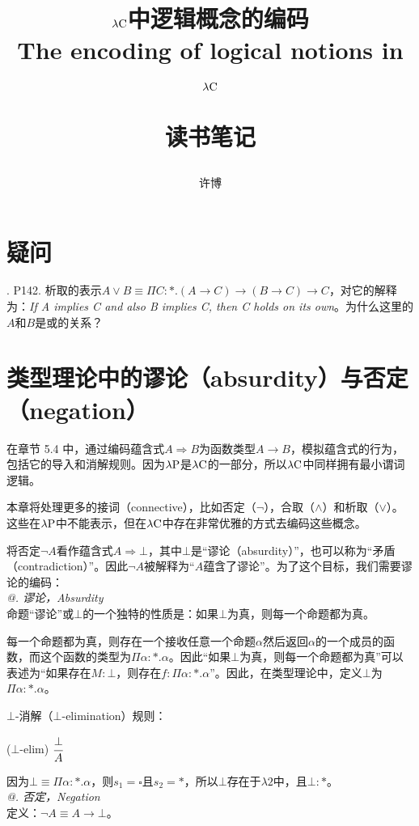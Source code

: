 \documentclass[UTF8]{article}
\title{$\lambda{\rm C}$中逻辑概念的编码\\The encoding of logical notions in $\lambda{\rm C}$\\[2ex]\begin{large}读书笔记\end{large}}
\author{许博}
\date{}
\makeatletter
\newcommand{\Rmnum}[1]{\expandafter\@slowromancap\romannumeral #1@}
\makeatother
\begin{document}
\maketitle
	\section{疑问}
	. P142. 析取的表示$A\lor B\equiv\Pi C:*.(A\rightarrow C)\rightarrow(B\rightarrow C)\rightarrow C$，对它的解释为：\textit{If A implies C and also B implies C, then C holds on its own}。为什么这里的$A$和$B$是或的关系？

	\section{类型理论中的谬论（absurdity）与否定（negation）}
	\noindent
	在章节 5.4 中，通过编码蕴含式$A\Rightarrow B$为函数类型$A\rightarrow B$，模拟蕴含式的行为，包括它的导入和消解规则。因为$\lambda{\rm P}$是$\lambda{\rm C}$的一部分，所以$\lambda{\rm C}$中同样拥有最小谓词逻辑。
	
		本章将处理更多的接词（connective），比如否定（$\neg$），合取（$\land$）和析取（$\lor$）。这些在$\lambda{\rm P}$中不能表示，但在$\lambda{\rm C}$中存在非常优雅的方式去编码这些概念。
		
		将否定$\neg A$看作蕴含式$A\Rightarrow \bot$，其中$\bot$是“谬论（absurdity）”，也可以称为“矛盾（contradiction）”。因此$\neg A$被解释为“$A$蕴含了谬论”。为了这个目标，我们需要谬论的编码：\\
		
	\noindent
	\textit{\Rmnum{1}. 谬论，Absurdity}\\
	命题“谬论”或$\bot$的一个独特的性质是：如果$\bot$为真，则每一个命题都为真。
	
		每一个命题都为真，则存在一个接收任意一个命题$\alpha$然后返回$\alpha$的一个成员的函数，而这个函数的类型为$\Pi\alpha:*.\alpha$。因此“如果$\bot$为真，则每一个命题都为真”可以表述为“如果存在$M:\bot$，则存在$f:\Pi\alpha:*.\alpha$”。因此，在类型理论中，定义$\bot$为$\Pi\alpha:*.\alpha$。
		
		$\bot$-消解（$\bot$-elimination）规则：
		
		($\bot$-elim) $\cfrac{\bot}{A}$
		
		因为$\bot\equiv\Pi\alpha:*.\alpha$，则$s_1=\square$且$s_2=*$，所以$\bot$存在于$\lambda{2}$中，且$\bot:*$。\\
		
	\noindent
	\textit{\Rmnum{2}. 否定，Negation}\\
	定义：$\neg A\equiv A\rightarrow\bot$。
	
\end{document}
